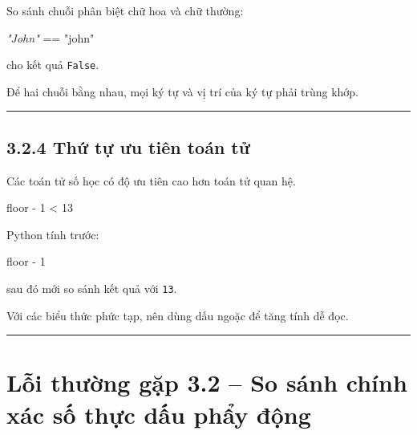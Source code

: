 \documentclass[
  11pt,
  a4paper,
]{article}
\newenvironment{Shaded}{}{}
\newcommand{\CommentTok}[1]{\textcolor[rgb]{0.38,0.63,0.69}{\textit{#1}}}
\newcommand{\DecValTok}[1]{\textcolor[rgb]{0.25,0.63,0.44}{#1}}
\newcommand{\NormalTok}[1]{#1}
\newcommand{\OperatorTok}[1]{\textcolor[rgb]{0.40,0.40,0.40}{#1}}
\newcommand{\StringTok}[1]{\textcolor[rgb]{0.25,0.44,0.63}{#1}}
\begin{document}
So sánh chuỗi phân biệt chữ hoa và chữ thường:

\begin{Shaded}
\begin{Highlighting}[]
\CommentTok{"John"} \OperatorTok{==} \StringTok{"john"}
\end{Highlighting}
\end{Shaded}

cho kết quả \texttt{False}.

Để hai chuỗi bằng nhau, mọi ký tự và vị trí của ký tự phải trùng khớp.

\begin{center}\rule{0.5\linewidth}{0.5pt}\end{center}

\subsection{3.2.4 Thứ tự ưu tiên toán
tử}\label{thux1ee9-tux1ef1-ux1b0u-tiuxean-touxe1n-tux1eed}

Các toán tử số học có độ ưu tiên cao hơn toán tử quan hệ.

\begin{Shaded}
\begin{Highlighting}[]
\NormalTok{floor }\OperatorTok{{-}} \DecValTok{1} \OperatorTok{\textless{}} \DecValTok{13}
\end{Highlighting}
\end{Shaded}

Python tính trước:

\begin{Shaded}
\begin{Highlighting}[]
\NormalTok{floor {-} 1}
\end{Highlighting}
\end{Shaded}

sau đó mới so sánh kết quả với \texttt{13}.

Với các biểu thức phức tạp, nên dùng dấu ngoặc để tăng tính dễ đọc.

\begin{center}\rule{0.5\linewidth}{0.5pt}\end{center}

\section{Lỗi thường gặp 3.2 -- So sánh chính xác số thực dấu phẩy
động}\label{lux1ed7i-thux1b0ux1eddng-gux1eb7p-3.2-so-suxe1nh-chuxednh-xuxe1c-sux1ed1-thux1ef1c-dux1ea5u-phux1ea9y-ux111ux1ed9ng}
\end{document}
